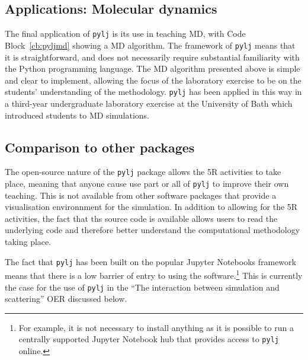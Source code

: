 \subsection{Applications: Molecular dynamics}
The final application of \texttt{pylj} is its use in teaching MD, with Code Block~\ref{cb:pyljmd} showing a MD algorithm.
The framework of \texttt{pylj} means that it is straightforward, and does not necessarily require substantial familiarity with the Python programming language.
The MD algorithm presented above is simple and clear to implement, allowing the focus of the laboratory exercise to be on the students' understanding of the methodology.
\texttt{pylj} has been applied in this way in a third-year undergraduate laboratory exercise at the University of Bath which introduced students to MD simulations.

\subsection{Comparison to other packages}
The open-source nature of the \texttt{pylj} package allows the 5R activities to take place, meaning that anyone cause use part or all of \texttt{pylj} to improve their own teaching.
This is not available from other software packages that provide a visualisation environnment for the simulation.
In addition to allowing for the 5R activities, the fact that ths source code is available allows users to read the underlying code and therefore better understand the computational methodology taking place.

The fact that \texttt{pylj} has been built on the popular Jupyter Notebooks framework means that there is a low barrier of entry to using the software.\footnote{For example, it is not necessary to install anything as it is possible to run a centrally supported Jupyter Notebook hub that provides access to \texttt{pylj} online.}
This is currently the case for the use of \texttt{pylj} in the ``The interaction between simulation and scattering'' OER discussed below.
